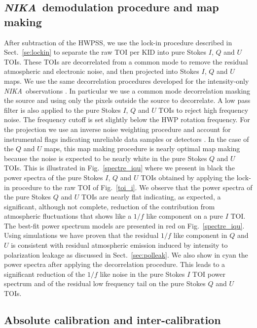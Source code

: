 \documentclass[twocolumn, traditabstract]{aa}
\newcommand{\nika}{{\it NIKA}}
\begin{document}
\subsection{\nika\ demodulation procedure and map making}
\label{se:demod_mapmaking}
After subtraction of the HWPSS, we use the lock-in procedure described in
Sect.~\ref{se:lockin} to separate the raw TOI per KID into pure Stokes $I$,
$Q$ and $U$ TOIs. These TOIs are decorrelated from a common mode to remove the
residual atmospheric and electronic noise, and then projected into Stokes $I$, $Q$ and
$U$ maps.  We use the same decorrelation procedures developed for the
intensity-only \nika\ observations \citep[see][for
 details]{adam2014,catalano2014}. In particular we use a common mode decorrelation masking the source
 and using only the pixels outside the source to decorrelate.
 A low pass filter is also applied to the pure
Stokes $I$, $Q$ and $U$ TOIs to reject high frequency noise. The frequency
cutoff is set slightly below the HWP rotation frequency.  For the projection we
use an inverse noise weighting procedure and account for instrumental flags
indicating unreliable data samples or detectors \citep[see][for details]{adam2014,catalano2014}.
In the case of the $Q$ and $U$ maps, this map
making procedure is nearly optimal map making because the noise is
expected to be nearly white in the pure Stokes $Q$ and $U$ TOIs. This is
illustrated in Fig.~\ref{spectre_iqu} where we present in black the power
spectra of the pure Stokes $I$, $Q$ and $U$ TOIs obtained by applying the lock-in
procedure to the raw TOI of Fig.~\ref{toi_i}. We observe that the power
spectra of the pure Stokes $Q$ and $U$ TOIs are nearly flat indicating, as
expected, a significant, although not complete, reduction of the contribution from
atmospheric fluctuations that shows like a $1/f$ like component on a pure $I$
TOI.
The best-fit power spectrum models are presented in red on
Fig.~\ref{spectre_iqu}. Using simulations we have proven that the residual $1/f$
like component in $Q$ and $U$ is consistent with residual atmospheric emission
induced by intensity to polarization leakage as discussed in
Sect.~\ref{sec:polleak}. We also show in cyan the power spectra after applying
the decorrelation procedure. This leads to a significant reduction of the $1/f$
like noise in the pure Stokes $I$ TOI power spectrum and of the residual low
frequency tail on the pure Stokes $Q$ and $U$ TOIs.
 
\subsection{Absolute calibration and inter-calibration}
\label{se:calib}
\end{document}
